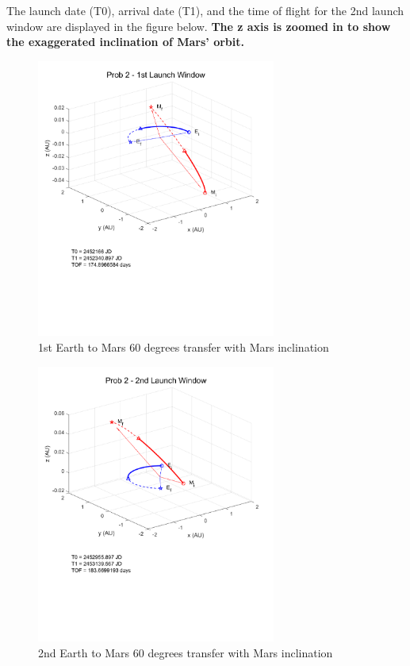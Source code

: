 \documentclass[conf]{new-aiaa}
\begin{document}
The launch date (T0), arrival date (T1), and the time of flight for the 2nd launch window are displayed in the figure below. \textbf{The z axis is zoomed in to show the exaggerated inclination of Mars' orbit.}

\begin{figure}[H]
    \centering 
    \includegraphics[width=0.7\textwidth]{Prob 2 - 1st Launch Window.pdf}
    \caption{1st Earth to Mars 60 degrees transfer with Mars inclination}
\end{figure}

\begin{figure}[H]
    \centering 
    \includegraphics[width=0.7\textwidth]{Prob 2 - 2nd Launch Window.pdf}
    \caption{2nd Earth to Mars 60 degrees transfer with Mars inclination}
\end{figure}
\end{document}
